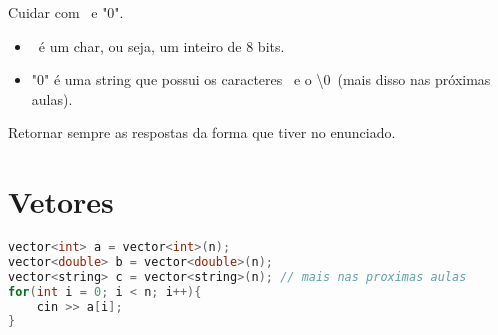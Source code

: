 \documentclass{article}
\begin{document}
Cuidar com \textquotesingle\  e "0".
\begin{itemize}
    \item {}\textquotesingle\ é um char, ou seja, um inteiro de 8 bits.
    \item "0" é uma string que possui os caracteres \textquotesingle\ e o \textquotesingle\textbackslash0\textquotesingle\ (mais disso nas próximas aulas).
\end{itemize}

Retornar sempre as respostas da forma que tiver no enunciado.

\section{Vetores}
\begin{lstlisting}[language=C++]
vector<int> a = vector<int>(n);
vector<double> b = vector<double>(n);   
vector<string> c = vector<string>(n); // mais nas proximas aulas
for(int i = 0; i < n; i++){
    cin >> a[i];
}
\end{lstlisting}
\end{document}

